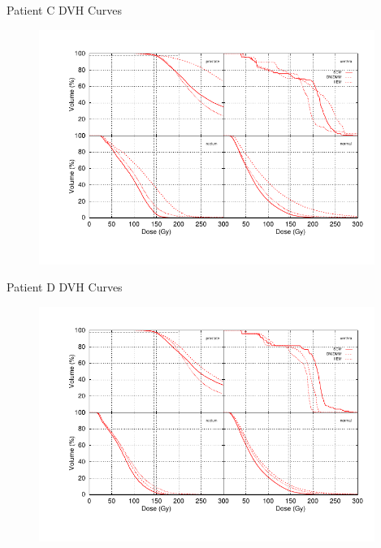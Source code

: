 \documentclass{beamer}
\begin{document}
\begin{frame}{Patient C DVH Curves}
  
  \begin{figure}[h!]
    \begin{center}
      \includegraphics[width=4.3in]{figures/dittmar-all4x4.pdf}
    \end{center}
  \end{figure}

\end{frame}

\begin{frame}{Patient D DVH Curves}
  
  \begin{figure}[h!]
    \begin{center}
      \includegraphics[width=4.3in]{figures/duckart-all4x4.pdf}
    \end{center}
  \end{figure}

\end{frame}
\end{document}
